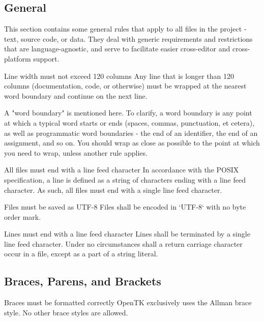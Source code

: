 \documentclass[11pt,a4paper]{article}
\newcounter{rule}[section]
\begin{document}
\subsection{General}
This section contains some general rules that apply to all files in the project - text, source code, or data. They deal with generic requirements and restrictions that are language-agnostic, and serve to facilitate easier cross-editor and cross-platform support.

\begin{must}{Line width must not exceed 120 columns}
Any line that is longer than 120 columns (documentation, code, or otherwise) must be wrapped at the nearest word boundary and continue on the next line. 
\end{must}

A "word boundary" is mentioned here. To clarify, a word boundary is any point at which a typical word starts or ends (spaces, commas, punctuation, et cetera), as well as programmatic word boundaries - the end of an identifier, the end of an assignment, and so on. You should wrap as close as possible to the point at which you need to wrap, unless another rule applies.

\begin{must}{All files must end with a line feed character}
In accordance with the POSIX specification, a line is defined as a string of characters ending with a line feed character. As such, all files must end with a single line feed character.
\end{must}

\begin{must}{Files must be saved as UTF-8}
Files shall be encoded in `UTF-8` with no byte order mark. 
\end{must}

\begin{must}{Lines must end with a line feed character}
Lines shall be terminated by a single line feed character. Under no circumstances shall a return carriage character occur in a file, except as a part of a string literal.
\end{must}

\subsection{Braces, Parens, and Brackets}
\begin{must}{Braces must be formatted correctly}
OpenTK exclusively uses the Allman brace style. No other brace styles are allowed.
\end{must}
\end{document}
